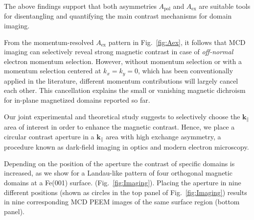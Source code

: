 \documentclass[prl,twocolumn,floatfix,superscriptaddress,aps]{revtex4-2}
\renewcommand{\vec}[1]{\boldsymbol{#1}}
\begin{document}
The above findings support that both asymmetries $A_{\mathrm{pol}}$ and $A_{\mathrm{ex}}$ are suitable tools for disentangling and quantifying the main contrast mechanisms for domain imaging. 

From the momentum-resolved $A_{\mathrm{ex}}$ pattern in Fig.~\ref{fig:Aex}, it follows that MCD imaging can selectively reveal strong magnetic contrast in case of \emph{off-normal} electron momentum selection. However, without momentum selection or with a momentum selection centered at $k_x = k_y = 0$, which has been conventionally applied in the literature, different momentum contributions will largely cancel each other. This cancellation explains the small or vanishing magnetic dichroism for in-plane magnetized domains reported so far.

Our joint experimental and theoretical study suggests to selectively choose the $\vec{k}_{\parallel}$ area of interest in order to enhance the magnetic contrast. Hence, we place a circular contrast aperture in a $\vec{k}_{\parallel}$ area with high exchange asymmetry, a procedure known as dark-field imaging in optics and modern electron microscopy. 

Depending on the position of the aperture the contrast of specific domains is increased, as we show for a Landau-like pattern of four orthogonal magnetic domains at a Fe(001) surface. (Fig.~\ref{fig:Imaging}). Placing the aperture in nine different positions (shown as circles in the top panel of Fig.~\ref{fig:Imaging})  results in nine corresponding MCD PEEM images of the same surface region (bottom panel). 
\end{document}
